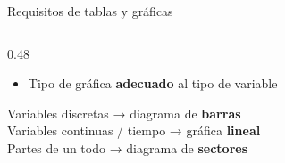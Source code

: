 \documentclass[aspectratio=169, 10pt, spanish]{beamer}
\begin{document}
\begin{frame}{Requisitos de tablas y gráficas}
\begin{columns}[T]
\begin{column}{0.48\textwidth}
\begin{itemize}
        \item[\faCheck] Tipo de gráfica \textbf{adecuado} al tipo de variable
      \end{itemize}
      \vspace{6pt}
      \begin{notabox}[Recuerda]
        \AlmFontFootnote
        Variables discretas → diagrama de \textbf{barras}\\
        Variables continuas / tiempo → gráfica \textbf{lineal}\\
        Partes de un todo → diagrama de \textbf{sectores}
      \end{notabox}
    \end{column}
  \end{columns}
\end{frame}

\end{document}
